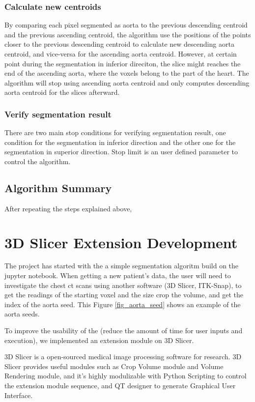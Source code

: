 \subsubsection{Calculate new centroids}
By comparing each pixel segmented as aorta to the previous descending centroid and the previous ascending centroid, the algorithm use the positions of the points closer to the previous descending centroid to calculate new descending aorta centroid, and vice-versa for the ascending aorta centroid. However, at certain point during the segmentation in inferior direciton, the slice might reaches the end of the ascending aorta, where the voxels belong to the part of the heart. The algorithm will stop using ascending aorta centroid and only computes descending aorta centroid for the slices afterward.

\subsubsection{Verify segmentation result}
There are two main stop conditions for verifying segmentation result, one condition for the segmentation in inferior direction and the other one for the segmentation in superior direction. Stop limit is an user defined parameter to control the algorithm.

\subsection{Algorithm Summary}
After repeating the steps explained above,



\section{3D Slicer Extension Development}
The project has started with the a simple segmentation algoritm build on the jupyter notebook. When getting a new patient's data, the user will need to investigate the chest ct scans using another software (3D Slicer, ITK-Snap), to get the readings of the starting voxel and the size crop the volume, and get the index of the aorta seed. This Figure \ref{fig_aorta_seed} shows an example of the aorta seeds.



To improve the usability of the \progname{} (reduce the amount of time for user inputs and execution), we implemented an extension module on 3D Slicer. 

3D Slicer is a open-sourced medical image processing software for research. 3D Slicer provides useful modules such as Crop Volume module and Volume Rendering module, and it's highly modulizable with Python Scripting to control the extension module sequence, and QT designer to generate Graphical User Interface.

